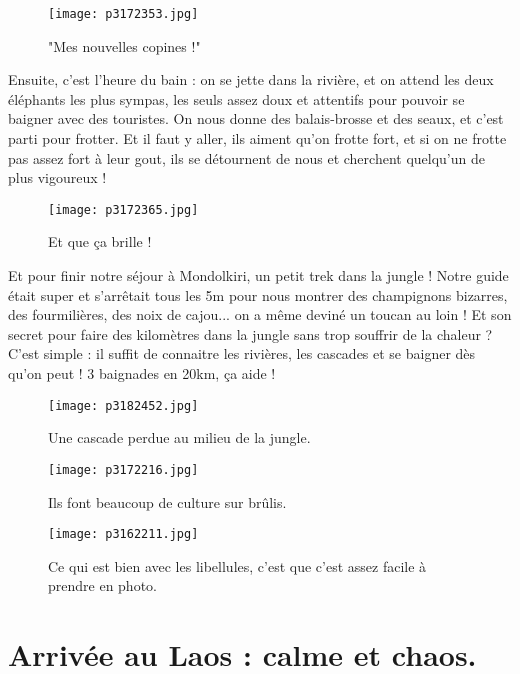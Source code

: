 \documentclass{book}
\begin{document}
\begin{figure}[h]
\centering
\texttt{[image: p3172353.jpg]}
\caption*{"Mes nouvelles copines !"}
\end{figure}

Ensuite, c'est l'heure du bain : on se jette dans la rivière, et on attend les deux éléphants les plus sympas, les seuls assez doux et attentifs pour pouvoir se baigner avec des touristes. On nous donne des balais-brosse et des seaux, et c'est parti pour frotter. Et il faut y aller, ils aiment qu'on frotte fort, et si on ne frotte pas assez fort à leur gout, ils se détournent de nous et cherchent quelqu'un de plus vigoureux !


\begin{figure}[h]
\centering
\texttt{[image: p3172365.jpg]}
\caption*{Et que ça brille !}
\end{figure}

Et pour finir notre séjour à Mondolkiri, un petit trek dans la jungle ! Notre guide était super et s'arrêtait tous les 5m pour nous montrer des champignons bizarres, des fourmilières, des noix de cajou... on a même deviné un toucan au loin ! Et son secret pour faire des kilomètres dans la jungle sans trop souffrir de la chaleur ? C'est simple : il suffit de connaitre les rivières, les cascades et se baigner dès qu'on peut ! 3 baignades en 20km, ça aide !


\begin{figure}[h]
\centering
\texttt{[image: p3182452.jpg]}
\caption*{Une cascade perdue au milieu de la jungle.}
\end{figure}


\begin{figure}[h]
\centering
\texttt{[image: p3172216.jpg]}
\caption*{Ils font beaucoup de culture sur brûlis.}
\end{figure}


\begin{figure}[h]
\centering
\texttt{[image: p3162211.jpg]}
\caption*{Ce qui est bien avec les libellules, c'est que c'est assez facile à prendre en photo.}
\end{figure}







\chapter{Arrivée au Laos : calme et chaos.}
\end{document}

